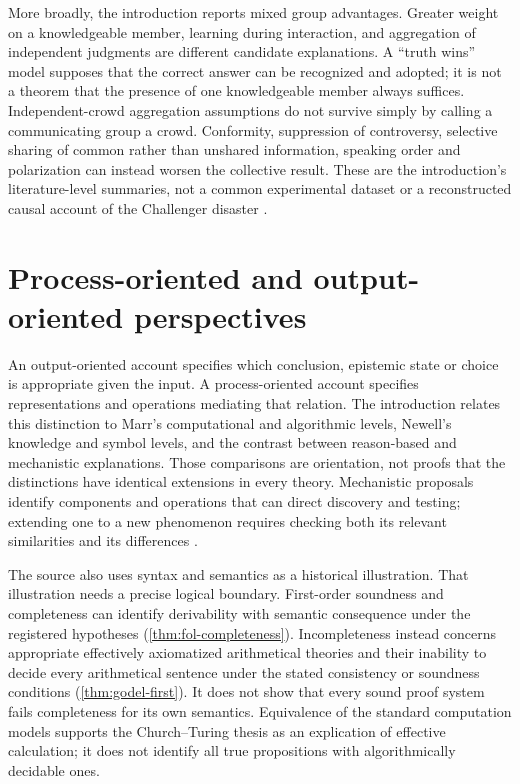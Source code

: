 More broadly, the introduction reports mixed group advantages.
Greater weight on a knowledgeable member, learning during interaction,
and aggregation of independent judgments are different candidate
explanations. A ``truth wins'' model supposes that the correct answer
can be recognized and adopted; it is not a theorem that the presence
of one knowledgeable member always suffices. Independent-crowd
aggregation assumptions do not survive simply by calling a
communicating group a crowd. Conformity, suppression of controversy,
selective sharing of common rather than unshared information, speaking
order and polarization can instead worsen the collective result.
These are the introduction's literature-level summaries, not a common
experimental dataset or a reconstructed causal account of the
Challenger disaster
\cite[pp.~29--31]{KnauffSpohn2021FrameworksIntro}.

\section{Process-oriented and output-oriented perspectives}
\label{sec:p11-ri-process-output}

An output-oriented account specifies which conclusion, epistemic state
or choice is appropriate given the input. A process-oriented account
specifies representations and operations mediating that relation.
The introduction relates this distinction to Marr's computational and
algorithmic levels, Newell's knowledge and symbol levels, and the
contrast between reason-based and mechanistic explanations. Those
comparisons are orientation, not proofs that the distinctions have
identical extensions in every theory. Mechanistic proposals identify
components and operations that can direct discovery and testing;
extending one to a new phenomenon requires checking both its relevant
similarities and its differences
\cite[pp.~31--34]{KnauffSpohn2021FrameworksIntro}.

The source also uses syntax and semantics as a historical illustration.
That illustration needs a precise logical boundary. First-order
soundness and completeness can identify derivability with semantic
consequence under the registered hypotheses
(\cref{thm:fol-completeness}). Incompleteness instead concerns
appropriate effectively axiomatized arithmetical theories and their
inability to decide every arithmetical sentence under the stated
consistency or soundness conditions
(\cref{thm:godel-first}). It does not show that every sound
proof system fails completeness for its own semantics. Equivalence of
the standard computation models supports the Church--Turing thesis
as an explication of effective calculation; it does not identify all
true propositions with algorithmically decidable ones.

